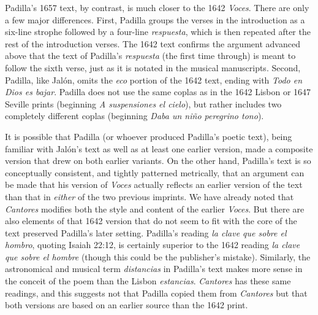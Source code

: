 Padilla's 1657 text, by contrast, is much closer to the 1642 \emph{Voces}.
There are only a few major differences.
First, Padilla groups the verses in the introduction as a six-line strophe
followed by a four-line \emph{respuesta}, which is then repeated after the rest of
the introduction verses. 
The 1642 text confirms the argument advanced above that the text of Padilla's
\emph{respuesta} (the first time through) is meant to follow the sixth verse, just as
it is notated in the musical manuscripts.
Second, Padilla, like Jalón, omits the \emph{eco} portion of the 1642 text, ending
with \emph{Todo en Dios es bajar}. 
Padilla does not use the same coplas as in the 1642 Lisbon or 1647 Seville
prints (beginning \emph{A suspensiones el cielo}), but rather includes two
completely different coplas (beginning \emph{Daba un niño peregrino tono}).

It is possible that Padilla (or whoever produced Padilla's poetic text), being
familiar with Jalón's text as well as at least one earlier version, made a
composite version that drew on both earlier variants.
On the other hand, Padilla's text is so conceptually consistent, and tightly
patterned metrically, that an argument can be made that his version of \emph{Voces}
actually reflects an earlier version of the text than that in \emph{either} of the
two previous imprints.
We have already noted that \emph{Cantores} modifies both the style and content of the
earlier \emph{Voces}.
But there are also elements of that 1642 version that do not seem to fit with
the core of the text preserved Padilla's later setting.
Padilla's reading \emph{la clave que sobre el hombro}, quoting Isaiah 22:12, is
certainly superior to the 1642 reading \emph{la clave que sobre el hombre} (though
this could be the publisher's mistake).
Similarly, the astronomical and musical term \emph{distancias} in Padilla's text
makes more sense in the conceit of the poem than the Lisbon \emph{estancias}.
\emph{Cantores} has these same readings, and this suggests not that Padilla copied them
from \emph{Cantores} but that both versions are based on an earlier source than the
1642 print.

